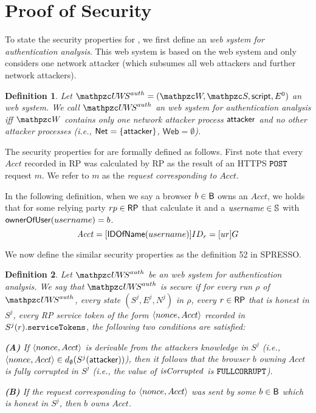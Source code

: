 \documentclass[letterpaper,onecolumn,10pt]{article}
\newtheorem{definition}{Definition}
\begin{document}
\section{Proof of Security}

To state the security properties for \uppresso, we first
define an \emph{\uppresso web system for authentication analysis}. This
web system is based on the \uppresso web system and only considers one
network attacker (which subsumes all web attackers and further network
attackers).

\begin{definition}
  Let $\uppressoauthwebsystem = (\bidsystem, \scriptset, \mathsf{script}, E^0)$
  an \uppresso web system. We call $\uppressoauthwebsystem$ an
  \emph{\uppresso web system for authentication analysis} iff
  $\bidsystem$ contains only one network attacker process
  $\mathsf{attacker}$ and no other attacker processes (i.e.,
  $\mathsf{Net} = \{\mathsf{attacker}\}$, $\mathsf{Web} = \emptyset$).
\end{definition}

The security properties for \uppresso are formally defined 
as follows. First note that every $Acct$ recorded in RP was
calculated by RP as the result of an HTTPS $\mathtt{POST}$ request 
$m$. We refer to $m$ as the 
\emph{request corresponding to $Acct$}. 

In the following definition, when we say a browser 
$b\in \mathsf{B}$ owns an $Acct$, we holds that for some relying 
party $rp\in \mathsf{RP}$ that calculate it and 
a $\mathit{username} \in \mathbb{S}$ with $\mathsf{ownerOfUser}(username) = b$.
\[\mathit{Acct}=[\mathsf{IDOfName}(username)]ID_r=[ur]G\]

We now define the similar security properties as the definition 52 in SPRESSO. 

\begin{definition}\label{def:uppresso-security-property} 
  Let $\uppressoauthwebsystem$ be an \uppresso web system for authentication analysis. 
  We say that \emph{$\uppressoauthwebsystem$ is secure} if for every run $\rho$ of
  $\uppressoauthwebsystem$, every state $(S^j, E^j, N^j)$ in $\rho$,
  every $r\in \mathsf{RP}$ that is honest in $S^j$, every RP service token of the form 
  $\langle {{}nonce, Acct} \rangle$ recorded in $S^j(r).\mathtt{serviceTokens}$, the following two conditions are
  satisfied:

  \textbf{(A)} If $\langle {{}nonce, Acct} \rangle$ is derivable from the attackers knowledge
  in $S^j$ (i.e., $\langle {{}nonce, Acct} \rangle \in d_{\emptyset}(S^j(\mathsf{attacker}))$),
  then it follows that the browser $b$ owning $Acct$ is fully corrupted
  in $S^j$ (i.e., the value of $\mathit{isCorrupted}$ is $\mathtt{FULLCORRUPT}$).

  \textbf{(B)} If the request corresponding to $\langle {{}nonce, Acct} \rangle$ was sent by
  some $b\in \mathsf{B}$ which is honest in $S^j$, then $b$ owns $Acct$.
\end{definition}
\end{document}
